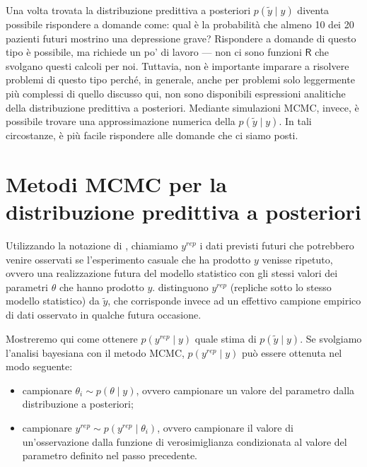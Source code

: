 \documentclass[
  10pt,
  italian,
  a4paper,
  extrafontsizes,onecolumn,openright
  ]{memoir}
\providecommand{\tightlist}{%
  \setlength{\itemsep}{0pt}\setlength{\parskip}{0pt}}
\newcommand{\R}{\textsf{R}} %
\begin{document}
Una volta trovata la distribuzione predittiva a posteriori \(p(\tilde{y} \mid y)\) diventa possibile rispondere a domande come: qual è la probabilità che almeno 10 dei 20 pazienti futuri mostrino una depressione grave? Rispondere a domande di questo tipo è possibile, ma richiede un po' di lavoro --- non ci sono funzioni \(\R\) che svolgano questi calcoli per noi. Tuttavia, non è importante imparare a risolvere problemi di questo tipo perché, in generale, anche per problemi solo leggermente più complessi di quello discusso qui, non sono disponibili espressioni analitiche della distribuzione predittiva a posteriori. Mediante simulazioni MCMC, invece, è possibile trovare una approssimazione numerica della \(p(\tilde{y} \mid y)\). In tali circostanze, è più facile rispondere alle domande che ci siamo posti.

\hypertarget{metodi-mcmc-per-la-distribuzione-predittiva-a-posteriori}{%
\section{Metodi MCMC per la distribuzione predittiva a posteriori}\label{metodi-mcmc-per-la-distribuzione-predittiva-a-posteriori}}

Utilizzando la notazione di \textcite{gelman2014understanding}, chiamiamo \(y^{rep}\) i dati previsti futuri che potrebbero venire osservati se l'esperimento casuale che ha prodotto \(y\) venisse ripetuto, ovvero una realizzazione futura del modello statistico con gli stessi valori dei parametri \(\theta\) che hanno prodotto \(y\). \textcite{gelman2014understanding} distinguono \(y^{rep}\) (repliche sotto lo stesso modello statistico) da \(\tilde{y}\), che corrisponde invece ad un effettivo campione empirico di dati osservato in qualche futura occasione.

Mostreremo qui come ottenere \(p(y^{rep} \mid y)\) quale stima di \(p(\tilde{y} \mid y)\). Se svolgiamo l'analisi bayesiana con il metodo MCMC, \(p(y^{rep} \mid y)\) può essere ottenuta nel modo seguente:

\begin{itemize}
\tightlist
\item
  campionare \(\theta_i \sim p(\theta \mid y)\), ovvero campionare un valore del parametro dalla distribuzione a posteriori;
\item
  campionare \(y^{rep} \sim p(y^{rep} \mid \theta_i)\), ovvero campionare il valore di un'osservazione dalla funzione di verosimiglianza condizionata al valore del parametro definito nel passo precedente.
\end{itemize}
\end{document}
